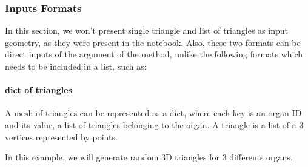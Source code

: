 \documentclass[letterpaper,10pt,english]{sphinxmanual}
\begin{document}
\subsubsection{Inputs Formats}
\label{\detokenize{input_scenes:Inputs-Formats}}
\sphinxAtStartPar
In this section, we won’t present single triangle and list of triangles as input geometry, as they were present in the  notebook. Also, these two formats can be direct inputs of the  argument of the  method, unlike the following formats which needs to be included in a list, such as:

\begin{sphinxVerbatim}[commandchars=\\\{\}]
    \PYG{p}{[}  \PYG{p}{]} 
\end{sphinxVerbatim}


\paragraph{dict of triangles}
\label{\detokenize{input_scenes:dict-of-triangles}}
\sphinxAtStartPar
A mesh of triangles can be represented as a dict, where each key is an organ ID and its value, a list of triangles belonging to the organ. A triangle is a list of a 3 vertices represented by points.

\sphinxAtStartPar
In this example, we will generate random 3D triangles for 3 differents organs.
\end{document}

